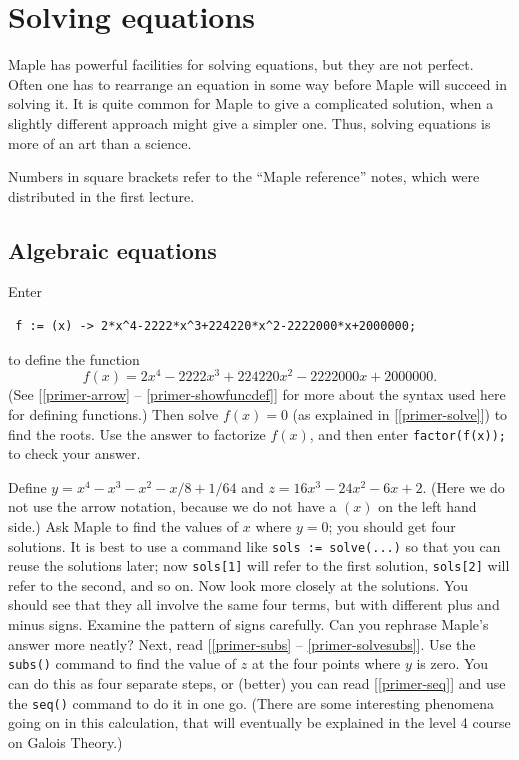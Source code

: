 \documentclass[a4paper,10pt]{amsbook}
\begin{document}
\chapter{Solving equations} 

Maple has powerful facilities for solving equations, but they are not
perfect.  Often one has to rearrange an equation in some way before
Maple will succeed in solving it.  It is quite common for Maple to
give a complicated solution, when a slightly different approach might
give a simpler one.  Thus, solving equations is more of an art than a
science.  

Numbers in square brackets refer to the ``Maple
reference'' notes, which were distributed in the first lecture.

\section{Algebraic equations}

\begin{exercise}\label{ex-decimal-roots}
 Enter
\begin{verbatim}
 f := (x) -> 2*x^4-2222*x^3+224220*x^2-2222000*x+2000000;
\end{verbatim}
 to define the function
 \[ f(x) = 2x^4-2222x^3+224220x^2-2222000x+2000000. \]
 (See [\ref{primer-arrow} -- \ref{primer-showfuncdef}] for more about
 the syntax used here for defining functions.) Then solve 
 $f(x)=0$ (as explained in [\ref{primer-solve}])
 to find the roots.  Use the answer to factorize $f(x)$, and then
 enter \verb~factor(f(x));~ to check your answer.
\end{exercise}

\begin{exercise}\label{ex-biquadratic-roots}
  Define $y=x^4-x^3-x^2-x/8+1/64$ and $z=16x^3-24x^2-6x+2$.  (Here we
  do not use the arrow notation, because we do not have a $(x)$ on the
  left hand side.)  Ask Maple to find the values of $x$ where $y=0$;
  you should get four solutions.  It is best to use a command like
  \verb~sols := solve(...)~ so that you can reuse the solutions later;
  now \verb~sols[1]~ will refer to the first solution, \verb~sols[2]~
  will refer to the second, and so on.  Now look more closely at the
  solutions.  You should see that they all involve the same four
  terms, but with different plus and minus signs.  Examine the pattern
  of signs carefully.  Can you rephrase Maple's answer more neatly?
  Next, read [\ref{primer-subs} -- \ref{primer-solvesubs}].  Use the
  \verb~subs()~ command to find the value of $z$ at the four points
  where $y$ is zero.  You can do this as four separate steps, or
  (better) you can read [\ref{primer-seq}] and use the \verb~seq()~
  command to do it in one go.  (There are some interesting phenomena
  going on in this calculation, that will eventually be explained in
  the level 4 course on Galois Theory.)
\end{exercise}
\end{document}
